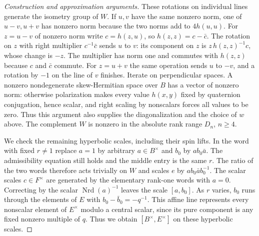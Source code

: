 \documentclass[11pt,a4paper,openany,oneside]{book}
\theoremstyle{resultstyle}
\theoremstyle{definition}
\numberwithin{equation}{chapter}
\begin{document}
\begin{proof}[Construction and approximation arguments]
These rotations on individual lines generate
the isometry group of \(W\).
If \(u,v\) have the same nonzero norm,
one of \(u-v,u+v\) has nonzero norm because
the two norms add to \(4h(u,u)\).
For \(z=u-v\) of nonzero norm write
\(c=h(z,u)\), so \(h(z,z)=c-\bar c\).
The rotation on \(z\) with right multiplier
\(c^{-1}\bar c\) sends \(u\) to \(v\):
its component on \(z\) is
\(z\,h(z,z)^{-1}c\), whose change is \(-z\).
The multiplier has norm one and commutes with
\(h(z,z)\) because \(c\) and \(\bar c\) commute.
For \(z=u+v\) the same operation sends \(u\)
to \(-v\), and a rotation by \(-1\) on
the line of \(v\) finishes. Iterate on
perpendicular spaces. A nonzero nondegenerate
skew-Hermitian space over \(B\) has a vector
of nonzero norm: otherwise polarization
makes every value \(h(x,y)\) fixed by
quaternion conjugation, hence scalar, and
right scaling by nonscalars forces all
values to be zero. Thus this argument
also supplies the diagonalization and
the choice of \(w\) above. The complement
\(W\) is nonzero in the absolute
rank range \(D_n\), \(n\geq4\).

We check the remaining hyperbolic scales,
including their spin lifts. In the word
with fixed \(r\ne1\) replace \(a=1\)
by arbitrary \(a\in B^\times\) and
\(b_0\) by \(a b_0\bar a\).
The admissibility equation still holds
and the middle entry is the same \(r\).
The ratio of the two words therefore
acts trivially on \(W\) and scales \(e\)
by \(a b_0\bar a b_0^{-1}\).
The scalar scales \(c\in F^\times\)
are generated by the elementary rank-one
words with \(a=0\). Correcting by the
scalar \(\operatorname{Nrd}(a)^{-1}\)
leaves the scale \([a,b_0]\).
As \(r\) varies, \(b_0\) runs through
the elements of \(E\) with
\(b_0-\bar b_0=-q^{-1}\).
This affine line represents every
nonscalar element of \(E^\times\)
modulo a central scalar, since its
pure component is any fixed nonzero
multiple of \(q\). Thus we obtain
\([B^\times,E^\times]\) on these
hyperbolic scales.


\end{proof}
\end{document}
